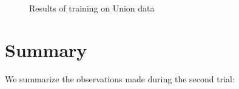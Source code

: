 \begin{figure}[t!]
\caption{Results of training on Union data}
\label{fig:union2}
\end{figure}

\section{Summary}

We summarize the observations made during the second trial:

